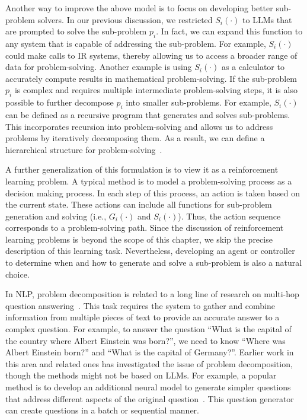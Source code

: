 Another way to improve the above model is to focus on developing better sub-problem solvers. In our previous discussion, we restricted $S_i(\cdot)$ to LLMs that are prompted to solve the sub-problem $p_i$. In fact, we can expand this function to any system that is capable of addressing the sub-problem. For example, $S_i(\cdot)$ could make calls to IR systems, thereby allowing us to access a broader range of data for problem-solving. Another example is using $S_i(\cdot)$ as a calculator to accurately compute results in mathematical problem-solving. If the sub-problem $p_i$ is complex and requires multiple intermediate problem-solving steps, it is also possible to further decompose $p_i$ into smaller sub-problems. For example, $S_i(\cdot)$ can be defined as a recursive program that generates and solves sub-problems. This incorporates recursion into problem-solving and allows us to address problems by iteratively decomposing them. As a result, we can define a hierarchical structure for problem-solving~\cite{khot2023:decomposed}.

A further generalization of this formulation is to view it as a reinforcement learning problem. A typical method is to model a problem-solving process as a decision making process. In each step of this process, an action is taken based on the current state. These actions can include all functions for sub-problem generation and solving (i.e., $G_i(\cdot)$ and $S_i(\cdot)$). Thus, the action sequence corresponds to a problem-solving path. Since the discussion of reinforcement learning problems is beyond the scope of this chapter, we skip the precise description of this learning task. Nevertheless, developing an agent or controller to determine when and how to generate and solve a sub-problem is also a natural choice.

In NLP, problem decomposition is related to a long line of research on multi-hop question answering~\cite{mavi-etal:2024multi}. This task requires the system to gather and combine information from multiple pieces of text to provide an accurate answer to a complex question. For example, to answer the question ``What is the capital of the country where Albert Einstein was born?'', we need to know ``Where was Albert Einstein born?'' and ``What is the capital of Germany?''. Earlier work in this area and related ones has investigated the issue of problem decomposition, though the methods might not be based on LLMs. For example, a popular method is to develop an additional neural model to generate simpler questions that address different aspects of the original question~\cite{andreas-etal:2016neural,talmor-etal:2018web,min-etal:2019multi}. This question generator can create questions in a batch or sequential manner.

